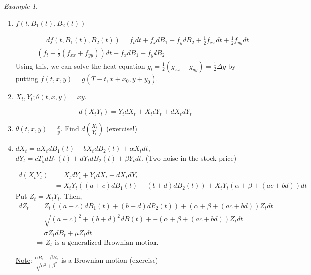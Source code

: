 \documentclass[12pt]{report}
\renewcommand{\1}{\mathbb{1}}
\theoremstyle{break}
\theoremstyle{newdef}
\theoremstyle{remark}
\newtheorem*{exmp}{Example} %
\begin{document}
\begin{exmp}
\leavevmode
\begin{enumerate}[wide]
\item
$f(t,B_1(t),B_2(t))$

$$
\begin{aligned}
&\phantom{==}df(t,B_1(t), B_2(t)) = f_tdt + f_x dB_1 + f_y dB_2 + \frac12 f_{xx} dt + \frac12 f_{yy} dt\\
&= \left(f_t + \frac12(f_{xx}+f_{yy})\right)dt + f_x dB_1 + f_y dB_2
\end{aligned}
$$
Using this, we can solve the heat equation $g_t = \frac12(g_{xx} + g_{yy}) = \frac12 \Delta g$
by putting $f(t,x,y) = g(T-t, x+x_0, y+y_0)$.

\item
$X_t, Y_t ; \theta(t,x,y) = xy$.

\begin{equation}
d(X_tY_t)
= Y_t dX_t + X_t dY_t + dX_t dY_t
\tag{product rule}
\end{equation}

\item
$\theta(t,x,y) = \frac{x}{y}$. Find $d(\frac{X_t}{Y_t})$ (exercise!)

\item
$dX_t = aX_t dB_1(t)+ bX_t dB_2(t) + \alpha X_t dt$,
$dY_t = cT_y dB_1(t) + dY_t dB_2(t) + \beta Y_t dt$.
(Two noise in the stock price)

$$
\begin{aligned}
d(X_tY_t)
&= X_t dY_t + Y_t dX_t + dX_t dY_t\\
&= X_tY_t((a+c)dB_1(t) + (b+d)dB_2(t))
+ X_tY_t(\alpha + \beta + (ac+bd))dt
\end{aligned}
$$
Put $Z_t = X_tY_t$. Then,
$$
\begin{aligned}
dZ_t &= Z_t\left((a+c)dB_1(t)+(b+d)dB_2(t) \right)
+ (\alpha+\beta+(ac+bd))Z_tdt\\
&= \sqrt{(a+c)^2 + (b+d)^2}dB(t) + + (\alpha+\beta+(ac+bd))Z_tdt\\
&= \sigma Z_t dB_t + \mu Z_t dt\\
&\Rightarrow Z_t \text{ is a generalized Brownian motion.}
\end{aligned}
$$

\underline{{Note}}:
$\frac{\alpha B_1 + \beta B_2}{\sqrt{\alpha^2+\beta^2}}$ is a Brownian motion (exercise)

\end{enumerate}
\end{exmp}
\end{document}
